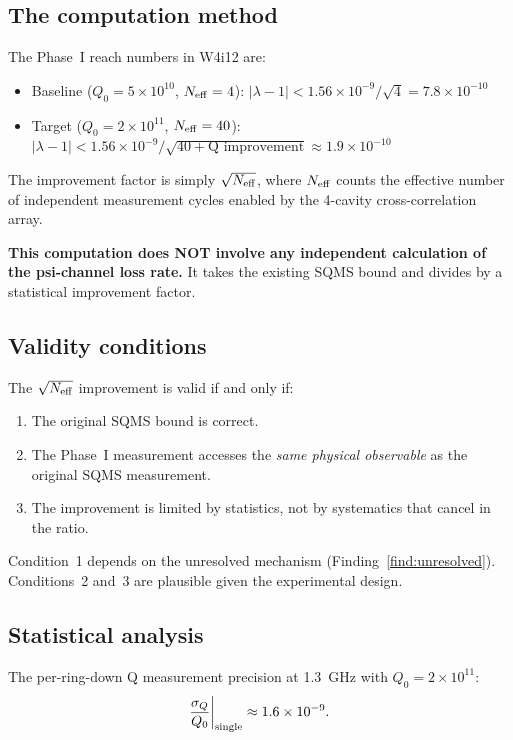 \documentclass[11pt]{article}
\newcommand{\lbone}{|\lambda - 1|}
\newcommand{\ee}[1]{\times 10^{#1}}
\theoremstyle{definition}
\theoremstyle{remark}
\begin{document}
\subsection{The computation method}

The Phase~I reach numbers in W4i12 are:
\begin{itemize}[nosep]
\item Baseline ($Q_0 = 5\ee{10}$, $N_{\rm eff} = 4$):
  $\lbone < 1.56\ee{-9}/\sqrt{4} = 7.8\ee{-10}$
\item Target ($Q_0 = 2\ee{11}$, $N_{\rm eff} = 40$):
  $\lbone < 1.56\ee{-9}/\sqrt{40+\text{Q improvement}} \approx 1.9\ee{-10}$
\end{itemize}

The improvement factor is simply $\sqrt{N_{\rm eff}}$, where
$N_{\rm eff}$ counts the effective number of independent measurement
cycles enabled by the 4-cavity cross-correlation array.

\textbf{This computation does NOT involve any independent calculation
of the psi-channel loss rate.} It takes the existing SQMS bound and
divides by a statistical improvement factor.

\subsection{Validity conditions}

The $\sqrt{N_{\rm eff}}$ improvement is valid if and only if:
\begin{enumerate}[nosep]
\item The original SQMS bound is correct.
\item The Phase~I measurement accesses the \emph{same physical
  observable} as the original SQMS measurement.
\item The improvement is limited by statistics, not by systematics
  that cancel in the ratio.
\end{enumerate}

Condition~1 depends on the unresolved mechanism (Finding~\ref{find:unresolved}).
Conditions~2 and~3 are plausible given the experimental design.

\subsection{Statistical analysis}

The per-ring-down Q measurement precision at 1.3~GHz with
$Q_0 = 2\ee{11}$:
\begin{equation}
\frac{\sigma_Q}{Q_0}\bigg|_{\rm single} \approx 1.6\ee{-9}.
\end{equation}
\end{document}
